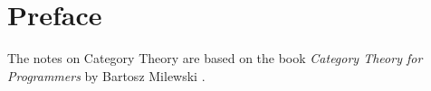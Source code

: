 \section*{Preface}

The notes on Category Theory are based on the book \textit{Category Theory for Programmers} by Bartosz Milewski \cite{catprog}.
